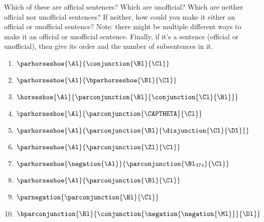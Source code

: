 Which of these are official sentences? Which are unofficial? Which are neither official nor unofficial sentences? If
neither, how could you make it either an official or unofficial sentence? Note: there
might be multiple different ways to make it an official or unofficial sentence. Finally, if it's a sentence (official or unofficial), then give its order and the number of subsentences in it. 
\begin{multicols}{2}
\begin{enumerate}
\item {$\parhorseshoe{\Al}{\conjunction{\Bl}{\Cl}}$}
\item {$\parhorseshoe{\Al}{\bparhorseshoe{\Bl}{\Cl}}$}
\item {$\horseshoe{\Al}{\parconjunction{\Bl}{\conjunction{\Cl}{\Bl}}}$}
\item {$\parhorseshoe{\Al}{\parconjunction{\CAPTHETA}{\Cl}}$}
\item {$\parhorseshoe{\Al}{\parconjunction{\Bl}{\disjunction{\Cl}{\Dl}}}$}
\item {$\parhorseshoe{\Al}{\parconjunction{\Zl}{\Cl}}$}
\item {$\parhorseshoe{\negation{\Al}}{\parconjunction{\Bl_{374}}{\Cl}}$}
\item {$\parhorseshoe{\Al}{\parconjunction{\Bl}{\Cl}}$}
\item {$\parnegation{\parconjunction{\Bl}{\Cl}}$}
\item {$\bparconjunction{\Bl}{\conjunction{\negation{\negation{\Ml}}}{\Dl}}$}
\end{enumerate}
\end{multicols}

